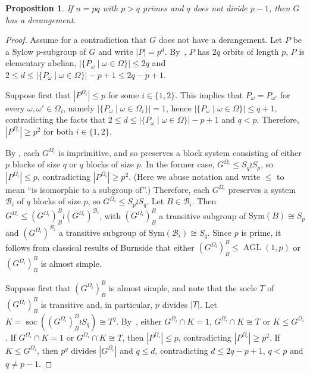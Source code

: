 \documentclass[11pt,a4paper]{amsart}
\newtheorem{proposition}[theorem]{Proposition}
\theoremstyle{definition}
\DeclareMathOperator{\AGL}{AGL}
\DeclareMathOperator{\soc}{soc}
\begin{document}
\begin{proposition}\label{LastDay}
If $n=pq$ with $p>q$ primes and $q$ does not divide $p-1$, then $G$ has a derangement.
\end{proposition}
\begin{proof}
Assume for a contradiction that $G$ does not have a derangement. Let $P$ be a Sylow $p$-subgroup of $G$ and write $|P|=p^d$. By~, $P$ has $2q$ orbits of length $p$, $P$ is elementary abelian, $|\{P_\omega\mid\omega\in\Omega\}|\leq 2q$ and  $2\leq d\leq |\{P_\omega\mid\omega\in\Omega\}|-p+1\leq 2q-p+1$. 


Suppose first that $|P^{\Omega_i}|\leq p$ for some $i\in\{1,2\}$. This implies that $P_\omega=P_{\omega'}$ for every $\omega,\omega'\in\Omega_i$, namely $|\{P_\omega\mid\omega\in\Omega_i\}|=1$, hence $|\{P_\omega\mid\omega\in\Omega\}|\leq q+1$, contradicting the facts that $2\leq d \leq |\{P_\omega\mid\omega\in\Omega\}|-p+1$ and $q<p$. Therefore, $|P^{\Omega_i}|\geq p^2$ for both $i\in\{1,2\}$.

By \cite[Corollary~4]{harper_ellis}, each $G^{\Omega_i}$ is imprimitive, and so preserves a block system consisting of either $p$ blocks of size $q$ or $q$ blocks of size $p$. In the former case, $G^{\Omega_i} \leq S_q \wr S_p$, so $|P^{\Omega_i}|\leq p$, contradicting $|P^{\Omega_i}|\geq p^2$. (Here we abuse notation and write $\leq$ to mean ``is isomorphic to a subgroup of''.) Therefore, each $G^{\Omega_i}$ preserves a system $\mathcal{B}_i$ of $q$ blocks of size $p$, so $G^{\Omega_i} \leq S_p \wr S_q$. Let $B\in\mathcal{B}_i$. Then $G^{\Omega_i}\leq (G^{\Omega_i})_B^B\wr (G^{\Omega_i})^{\mathcal{B}_i}$, with $(G^{\Omega_i})_B^B$ a transitive subgroup of $\text{Sym}(B) \cong S_p$ and $(G^{\Omega_i})^{\mathcal{B}_i}$ a transitive subgroup of $\text{Sym}(\mathcal{B}_i) \cong S_q$. Since $p$ is prime, it follows from classical results of Burnside \cite[Chapter~IX, Theorem~IX]{Burnside} that either $(G^{\Omega_i})_B^B \leq \AGL(1,p)$ or $(G^{\Omega_i})_B^B$ is almost simple. 

Suppose first that $(G^{\Omega_i})_B^B$ is almost simple, and note that the socle $T$ of $(G^{\Omega_i})_B^B$ is transitive and, in particular, $p$ divides $|T|$. Let $K=\soc ((G^{\Omega_i})_B^B\wr S_q)\cong T^q$. By~, either $G^{\Omega_i}\cap K=1$, $G^{\Omega_i}\cap K\cong T$ or $K\leq G^{\Omega_i}$. If $G^{\Omega_i}\cap K=1$ or $G^{\Omega_i}\cap K\cong T$, then  $|P^{\Omega_i}|\leq p$, contradicting $|P^{\Omega_i}|\geq p^2$. If $K\leq G^{\Omega_i}$, then $p^q$ divides $|G^{\Omega_i}|$ and $q\leq d$, contradicting $d \leq 2q-p+1$, $q<p$ and $q\neq p-1$.


\end{proof}
\end{document}
